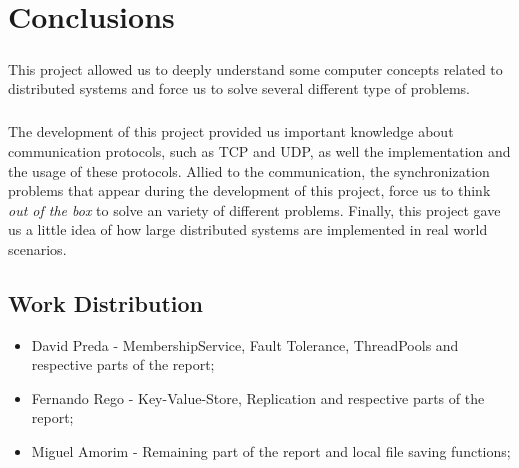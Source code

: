 \documentclass{report}
\begin{document}
	\chapter{Conclusions}
	
	        \paragraph{}This project allowed us to deeply understand some computer concepts
			related to distributed systems and force us to solve several different type of 
			problems. 
	        
	        \paragraph{} The development of this project provided us important knowledge
			about communication protocols, such as TCP and UDP, as well the implementation and
			the usage of these protocols. Allied to the communication, the synchronization 
			problems that appear during the development of this project, force us to think 
			\emph{out of the box} to solve an variety of different problems. Finally, this 
			project gave us a little idea of how large distributed systems are implemented
			in real world scenarios. 
			
			\section{Work Distribution}
			
				\begin{itemize}
					\item David Preda - MembershipService, Fault Tolerance, ThreadPools and respective parts of the report;
					\item Fernando Rego - Key-Value-Store, Replication and respective parts of the report;
					\item Miguel Amorim - Remaining part of the report and local file saving functions;
				\end{itemize}
\end{document}
